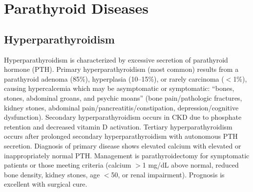 \section{Parathyroid Diseases}








\label{sec:Parathyroid Diseases}

\subsection{Hyperparathyroidism}
\label{sec:Hyperparathyroidism}
Hyperparathyroidism is characterized by excessive secretion of parathyroid hormone (PTH). Primary hyperparathyroidism (most common) results from a parathyroid adenoma (85\%), hyperplasia (10--15\%), or rarely carcinoma ($<$1\%), causing hypercalcemia which may be asymptomatic or symptomatic: ``bones, stones, abdominal groans, and psychic moans'' (bone pain/pathologic fractures, kidney stones, abdominal pain/pancreatitis/constipation, depression/cognitive dysfunction). Secondary hyperparathyroidism occurs in CKD due to phosphate retention and decreased vitamin D activation. Tertiary hyperparathyroidism occurs after prolonged secondary hyperparathyroidism with autonomous PTH secretion. Diagnosis of primary disease shows elevated calcium with elevated or inappropriately normal PTH. Management is parathyroidectomy for symptomatic patients or those meeting criteria (calcium $>$1 mg/dL above normal, reduced bone density, kidney stones, age $<$50, or renal impairment). Prognosis is excellent with surgical cure.

